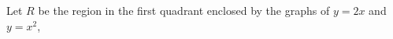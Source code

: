 
%
%
%
%
% 
% 
\question  Let $R$ be the region in the first quadrant enclosed by the graphs of $y=2x$ and $y=x^2$, \asif

